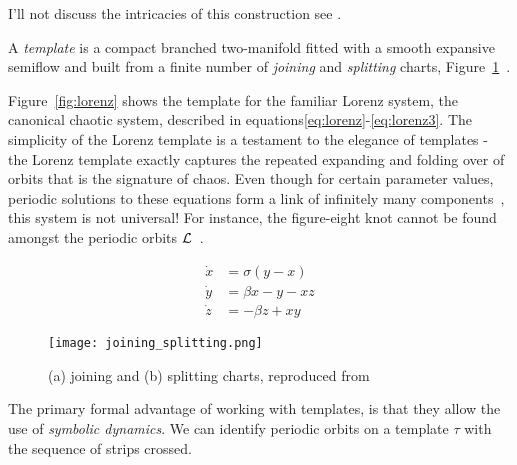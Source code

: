 \documentclass[main.tex]{subfiles}
\begin{document}
I'll not discuss the intricacies of this construction see \cite{bw1983b}.


\begin{definition}[Template]
  A \emph{template} is a compact branched two-manifold fitted with a smooth expansive semiflow and built from a finite number of \emph{joining} and \emph{splitting} charts, Figure~\ref{fig:joinsplit}~\cite{knottyode}.\label{def:template}
\end{definition}

Figure~\ref{fig:lorenz} shows the template for the familiar Lorenz system, the canonical chaotic system, described in equations\ref{eq:lorenz}-\ref{eq:lorenz3}. The simplicity of the Lorenz template is a testament to the elegance of
templates - the Lorenz template exactly captures the repeated expanding and folding over of orbits that is the signature of chaos. Even though for certain parameter values, periodic solutions to these equations form a link of infinitely
many components~\cite{knottyode}, this system is not universal! For instance, the figure-eight knot cannot be found amongst the periodic orbits $\mathcal{L}$~\cite{knottyode}.

\begin{align}
  \label{eq:lorenz}
  \dot{x} &= \sigma(y - x ) \\
  \label{eq:lorenz2}
  \dot{y} &= \beta x - y - x z \\
  \label{eq:lorenz3}
  \dot{z} &= - \beta z + x y
\end{align}

\begin{figure}[h]
  \centering
  \texttt{[image: joining\_splitting.png]}
  \caption[what goes here]{(a) joining and (b) splitting charts, reproduced from~\cite{knottyode}\protect\footnotemark}\label{fig:joinsplit}
\end{figure}






The primary formal advantage of working with templates, is that they allow the use of \emph{symbolic dynamics}. We can identify periodic orbits on a template $\tau$ with the sequence of strips crossed.
\end{document}

